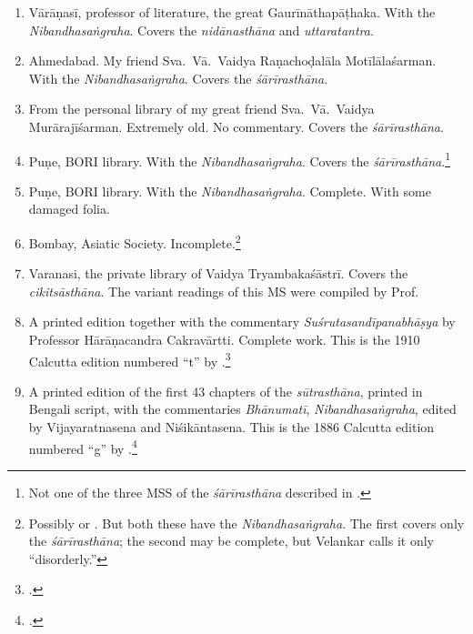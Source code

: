 \begin{enumerate}
    
    \item[1] Vārāṇasī, professor of literature, the great Gaurīnāthapāṭhaka.  With the 
    \emph{Nibandhasaṅgraha}. Covers the \emph{nidānasthāna} and \emph{uttaratantra}.
    
    \item [2]  Ahmedabad.  My friend Sva.\ Vā.\ Vaidya Raṇachoḍalāla Motīlālaśarman.  
    With the \emph{Nibandhasaṅgraha}.  Covers the \emph{śārīrasthāna}.
    
    \item [3] From the personal library of my great friend Sva.\ Vā.\ Vaidya
    Murārajīśarman. Extremely old. No commentary.  Covers the \emph{śārīrasthāna}.
    
    \item [4]  Puṇe, BORI library.  With the \emph{Nibandhasaṅgraha}. Covers the
    \emph{śārīrasthāna}.\footnote{Not one of the three MSS of the
    \emph{śārīrasthāna} described in \cite{shar-vaid}.}
    
    \item [5]  Puṇe, BORI library.  With the \emph{Nibandhasaṅgraha}. Complete.  
    With some damaged folia.
    
    \item [6]  Bombay, Asiatic Society.  Incomplete.\footnote{Possibly  or  \citep[v.\,1, \# 212 and 
    213]{vela-1930}.  But both these have the \emph{Nibandhasaṅgraha}.  The first 
    covers only the \emph{śārīrasthāna}; the second may be complete, but Velankar calls it 
    only “disorderly.”}
    
    \item [7] Varanasi, the private library of Vaidya Tryambakaśāstrī.  Covers the 
    \emph{cikitsāsthāna}.  The variant readings of this MS were compiled by Prof.\ 
    
    \item [8]  A printed edition together with the commentary 
    \emph{Suśrutasandīpanabhāṣya} by Professor Hārāṇacandra Cakravārtti. Complete work.
    This is the 1910 Calcutta edition numbered “t” by \citet[IB, 
    312]{meul-hist}.\footcite{bhat-1917}
    
    \item [9] A printed edition of the first 43 chapters of the
    \emph{sūtrasthāna}, printed in Bengali script, with the commentaries
    \emph{Bhānumatī}, \emph{Nibandhasaṅgraha}, edited by Vijayaratnasena and
    Niśikāntasena. This is the 1886 Calcutta edition numbered “g” by \citet[IB,
    311]{meul-hist}.\footcite{sena-1886}
    
\end{enumerate}


